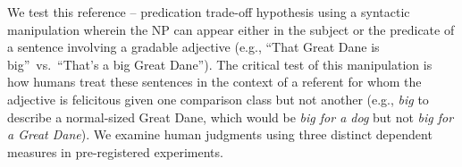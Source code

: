 \documentclass[10pt,letterpaper]{article}
\begin{document}

We test this reference -- predication trade-off hypothesis using a syntactic manipulation wherein the NP can appear either in the subject or the predicate of a sentence involving a gradable adjective (e.g., ``That Great Dane is big''~vs.~``That's a big Great Dane''). 
The critical test of this manipulation is how humans treat these sentences in the context of a referent for whom the adjective is felicitous given one comparison class but not another (e.g., \emph{big} to describe a normal-sized Great Dane, which would be \emph{big for a dog} but not \emph{big for a Great Dane}). 
We examine human judgments using three distinct dependent measures in pre-registered experiments. 
\end{document}
